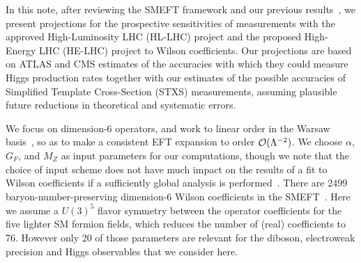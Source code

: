 \documentclass[../report.tex]{subfiles}
\begin{document}
\label{sec8:intro}



\label{sec8:smeft}

In this note, after reviewing the SMEFT framework and our previous results~\cite{Ellis:2018gqa,Ellis:2014dva, Ellis:2014jta, Murphy:2017omb}, we present projections for the
prospective sensitivities of measurements with the approved High-Luminosity LHC (HL-LHC) project and the proposed High-Energy LHC (HE-LHC) project
to Wilson coefficients. 
Our projections are based on ATLAS and CMS estimates of the accuracies with which they
could measure Higgs production rates together with our estimates of the possible accuracies of Simplified Template Cross-Section (STXS)
measurements, assuming plausible future reductions in theoretical and systematic errors.


We focus on dimension-6 operators, and work to linear order in the Warsaw basis~\cite{Grzadkowski:2010es},
so as to make a consistent EFT expansion to order ${\cal O}(\Lambda^{-2})$. 
We choose $\alpha$, $G_F$, and $M_Z$ as input parameters for our computations, though we note that
the choice of input scheme does not have much impact on the results of a fit to Wilson coefficients if a sufficiently global analysis is performed~\cite{Brivio:2017bnu}.
There are 2499 baryon-number-preserving dimension-6 Wilson coefficients in the SMEFT~\cite{Alonso:2013hga}.
Here we assume a $U(3)^5$ flavor symmetry between the operator coefficients for the five lighter SM fermion fields,
which reduces the number of (real) coefficients to 76.
However only 20 of those parameters are relevant for the diboson, electroweak precision and Higgs observables that we consider here.
\end{document}

